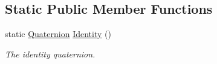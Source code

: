 \subsection*{Static Public Member Functions}
\begin{DoxyCompactItemize}
\item 
\hypertarget{classgofxmath_1_1_quaternion_ae071fa7b5b88bedc7dc4786448335f42}{}static \hyperlink{classgofxmath_1_1_quaternion}{Quaternion} \hyperlink{classgofxmath_1_1_quaternion_ae071fa7b5b88bedc7dc4786448335f42}{Identity} ()\label{classgofxmath_1_1_quaternion_ae071fa7b5b88bedc7dc4786448335f42}

\begin{DoxyCompactList}\small\item\em The identity quaternion. \end{DoxyCompactList}\end{DoxyCompactItemize}
